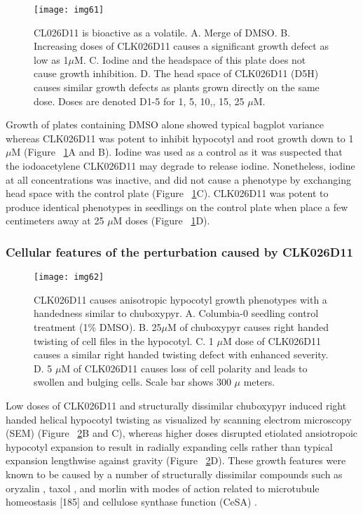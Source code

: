 \begin{figure}
\centering
\texttt{[image: img61]}
\caption{CL026D11 is bioactive as a volatile. A. Merge of DMSO. B. Increasing doses of CLK026D11 causes a significant growth defect as low as 1$\mu$M. C. Iodine and the headspace of this plate does not cause growth inhibition. D. The head space of CLK026D11 (D5H) causes similar growth defects as plants grown directly on the same dose. Doses are denoted D1-5 for 1, 5, 10,, 15, 25 $\mu$M.}
\label{fig:CLK026D11ComesThroughTheAir}
\end{figure}

Growth of plates containing DMSO alone showed typical bagplot variance whereas CLK026D11 was potent to inhibit hypocotyl and root growth down to 1 $\mu$M (Figure ~\ref{fig:CLK026D11ComesThroughTheAir}A and B). Iodine was used as a control as it was suspected that the iodoacetylene CLK026D11 may degrade to release iodine. Nonetheless, iodine at all concentrations was inactive, and did not cause a phenotype by exchanging head space with the control plate (Figure ~\ref{fig:CLK026D11ComesThroughTheAir}C).  CLK026D11 was potent to produce identical phenotypes in seedlings on the control plate when place a few centimeters away at 25 $\mu$M doses (Figure ~\ref{fig:CLK026D11ComesThroughTheAir}D).

\subsubsection{Cellular features of the perturbation caused by CLK026D11}

\begin{figure}\centering
\texttt{[image: img62]}
\caption{CLK026D11 causes anisotropic hypocotyl growth phenotypes with a handedness similar to chuboxypyr. A. Columbia-0 seedling control treatment (1{\%} DMSO). B. 25$\mu$M of chuboxypyr causes right handed twisting of cell files in the hypocotyl. C. 1 $\mu$M dose of CLK026D11 causes a similar right handed twisting defect with enhanced severity. D. 5 $\mu$M of CLK026D11 causes loss of cell polarity and leads to swollen and bulging cells. Scale bar shows 300 $\mu$ meters.}
\label{fig:CLK026D11SEM}
\end{figure}

Low doses of CLK026D11 and structurally dissimilar chuboxypyr \cite{Zhao_Hyr1} induced right handed helical hypocotyl twisting as visualized by scanning electrom microscopy (SEM) (Figure ~\ref{fig:CLK026D11SEM}B and C), whereas higher doses disrupted etiolated ansiotropoic hypocotyl expansion to result in radially expanding cells rather than typical expansion lengthwise against gravity (Figure ~\ref{fig:CLK026D11SEM}D). These growth features were known to be caused by a number of structurally dissimilar compounds such as oryzalin \cite{bannigan2006cortical,bartels1973comparison}, taxol \cite{baskin1994morphology,morejohn1987oryzalin}, and morlin \cite{debolt2007morlin} with modes of action related to microtubule homeostasis [185] and cellulose synthase function (CeSA) \cite{debolt2007morlin}. 

